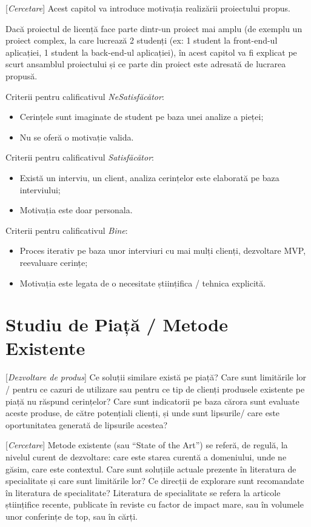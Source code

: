 \documentclass[12pt,a4paper]{report}
\newcommand{\worktype}[1]{[\textit{#1}] }
\newcommand{\dezvoltare}{\worktype{Dezvoltare de produs}}
\newcommand{\cercetare}{\worktype{Cercetare}}
\begin{document}
\cercetare Acest capitol va introduce motivația realizării proiectului propus.

Dacă proiectul de licență face parte dintr-un proiect mai amplu (de exemplu un proiect complex, la care lucrează 2 studenți (ex: 1 student la front-end-ul aplicației, 1 student la back-end-ul aplicației), în acest capitol va fi explicat pe scurt ansamblul proiectului și ce parte din proiect este adresată de lucrarea propusă. 

Criterii pentru calificativul \textit{Ne\textit{Satisfăcător}}: 
\begin{itemize}
	\item \dezvoltare Cerințele sunt imaginate de student pe baza unei analize a pieței;
	\item \cercetare Nu se oferă o motivație valida.
\end{itemize}

Criterii pentru calificativul \textit{Satisfăcător}: 
\begin{itemize}
	\item \dezvoltare Există un interviu, un client, analiza cerințelor este elaborată pe baza interviului;
	\item \cercetare Motivația este doar personala.
\end{itemize}


Criterii pentru calificativul \textit{Bine}: 
\begin{itemize}
	\item	 \dezvoltare Proces iterativ pe baza unor interviuri cu mai mulți clienți, dezvoltare MVP, reevaluare cerințe;
	\item	 \cercetare Motivația este legata de o necesitate științifica / tehnica explicită.
\end{itemize}


\chapter{Studiu de Piață / Metode Existente}
\dezvoltare Ce soluții similare există pe piață? Care sunt limitările lor / pentru ce cazuri de utilizare sau pentru ce tip de clienți produsele existente pe piață nu răspund cerințelor? Care sunt indicatorii pe baza cărora sunt evaluate aceste produse, de către potențiali clienți, și unde sunt lipsurile/ care este oportunitatea generată de lipsurile acestea?

\cercetare Metode existente (sau ``State of the Art'') se referă, de regulă, la nivelul curent de dezvoltare: care este starea curentă a domeniului, unde ne găsim, care este contextul. Care sunt soluțiile actuale prezente în literatura de specialitate și care sunt limitările lor? Ce direcții de explorare sunt recomandate în literatura de specialitate? Literatura de specialitate se refera la articole științifice recente, publicate în reviste cu factor de impact mare, sau în volumele unor conferințe de top, sau în cărți.
\end{document}
